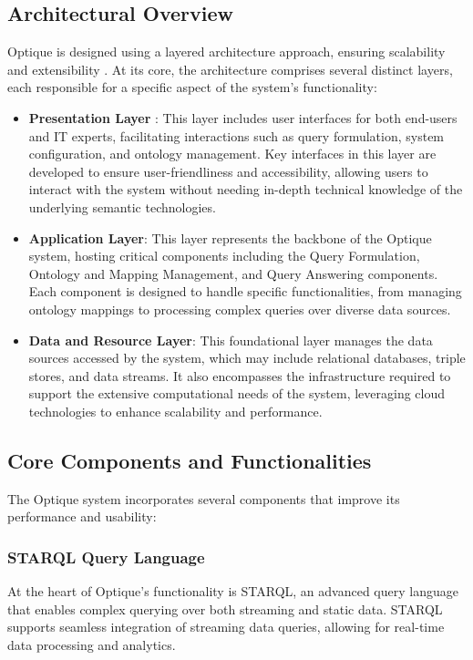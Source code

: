 \subsection{Architectural Overview}
Optique is designed using a layered architecture approach, ensuring scalability and extensibility \cite{DBLP:conf/esws/KharlamovJZBGHHKKORRSSSW13}. At its core, the architecture comprises several distinct layers, each responsible for a specific aspect of the system's functionality:
\begin{itemize}
\item \textbf{Presentation Layer} : This layer includes user interfaces for both end-users and IT experts, facilitating interactions such as query formulation, system configuration, and ontology management. Key interfaces in this layer are developed to ensure user-friendliness and accessibility, allowing users to interact with the system without needing in-depth technical knowledge of the underlying semantic technologies.
\item \textbf{Application Layer}: This layer represents the backbone of the Optique system, hosting critical components including the Query Formulation, Ontology and Mapping Management, and Query Answering components. Each component is designed to handle specific functionalities, from managing ontology mappings to processing complex queries over diverse data sources.
\item \textbf{Data and Resource Layer}: This foundational layer manages the data sources accessed by the system, which may include relational databases, triple stores, and data streams. It also encompasses the infrastructure required to support the extensive computational needs of the system, leveraging cloud technologies to enhance scalability and performance. 
\end{itemize}
\subsection{Core Components and Functionalities}
The Optique system incorporates several components that improve its performance and usability:
\subsubsection{STARQL Query Language}
At the heart of Optique's functionality is STARQL, an advanced query language that enables complex querying over both streaming and static data. STARQL supports seamless integration of streaming data queries, allowing for real-time data processing and analytics.
